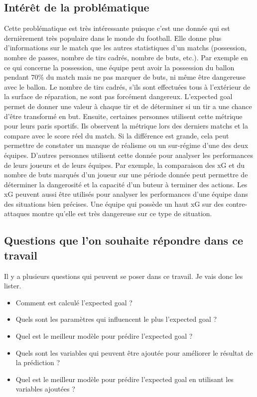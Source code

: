 \documentclass[12pt]{article}
\begin{document}
\subsection{Intérêt de la problématique}
\noindent Cette problématique est très intéressante puisque c'est une donnée qui est dernièrement très populaire dans le monde du football. Elle donne plus d'informations sur le match que les autres statistiques d'un matchs (possession, nombre de passes, nombre de tirs cadrés, nombre de buts, etc.). Par exemple en ce qui concerne la possession, une équipe peut avoir la possession du ballon pendant 70\% du match mais ne pas marquer de buts, ni même être dangereuse avec le ballon. Le nombre de tirs cadrés, s'ils sont effectuées tous à l'extérieur de la surface de réparation, ne sont pas forcément dangereux. L'expected goal permet de donner une valeur à chaque tir et de déterminer si un tir a une chance d'être transformé en but.
\newline \newline
Ensuite, certaines personnes utilisent cette métrique pour leurs paris sportifs. Ils observent la métrique lors des derniers matchs et la compare avec le score réel du match. Si la différence est grande, cela peut permettre de constater un manque de réalisme ou un sur-régime d'une des deux équipes. \cite{tennerelBienUtiliserExpected2022a}
\newline \newline
D'autres personnes utilisent cette donnée pour analyser les performances de leurs joueurs et de leurs équipes. Par exemple, la comparaison des xG et du nombre de buts marqués d'un joueur sur une période donnée peut permettre de déterminer la dangerosité et la capacité d'un buteur à terminer des actions. \cite{pettyWhatExpectedGoals2018a}
Les xG peuvent aussi être utilisés pour analyser les performances d'une équipe dans des situations bien précises. Une équipe qui possède un haut xG sur des contre-attaques montre qu'elle est très dangereuse sur ce type de situation. \cite{XGExplainedFBrefa}

\subsection{Questions que l'on souhaite répondre dans ce travail}
\noindent Il y a plusieurs questions qui peuvent se poser dans ce travail. Je vais donc les lister.
\begin{itemize}
    \item Comment est calculé l'expected goal ?
    \item Quels sont les paramètres qui influencent le plus l'expected goal ?
    \item Quel est le meilleur modèle pour prédire l'expected goal ?
    \item Quels sont les variables qui peuvent être ajoutée pour améliorer le résultat de la prédiction ?
    \item Quel est le meilleur modèle pour prédire l'expected goal en utilisant les variables ajoutées ?
\end{itemize}
\end{document}

